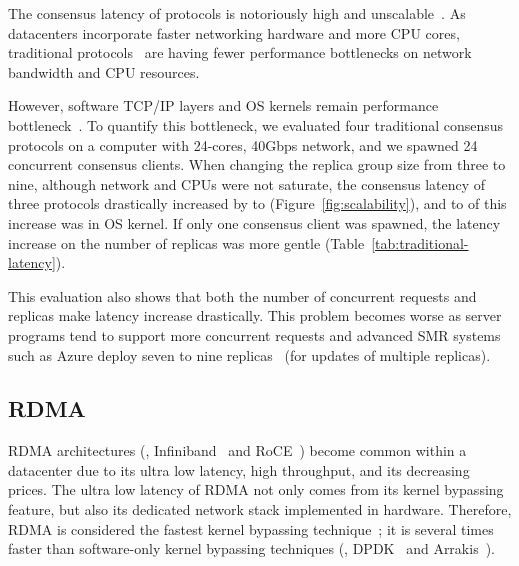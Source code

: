 The consensus latency of \paxos protocols is notoriously high and 
unscalable~\cite{zookeeper,scatter:sosp11}. As datacenters incorporate 
faster networking hardware and more CPU cores, traditional \paxos 
protocols~\cite{libpaxos,spaxos:srds12,crane:sosp15,rex:eurosys14,zookeeper} are 
having fewer performance bottlenecks on network bandwidth and CPU resources. 


However, software TCP/IP layers and OS kernels remain performance 
bottleneck~\cite{arrakis:osdi14}. To quantify this bottleneck, we evaluated 
four traditional consensus protocols on a computer with 24-cores, 40Gbps 
network, and we spawned 24 concurrent consensus clients. When changing the 
replica group size from three to nine, although network and CPUs were not 
saturate, the consensus latency of three protocols drastically increased by 
\tradlatencyincreaselow to \tradlatencyincreasehigh 
(Figure~\ref{fig:scalability}), and \systemcostlow to \systemcosthigh of this 
increase was in OS kernel. If only one consensus client was spawned, the latency 
increase on the number of replicas was more gentle 
(Table~\ref{tab:traditional-latency}).

This evaluation also shows that both the number of concurrent requests and 
replicas make \paxos latency increase drastically. This problem becomes worse 
as server programs tend to support more concurrent requests and advanced SMR 
systems such as Azure deploy seven to nine replicas~\cite{azure:book} 
(for updates of multiple replicas).




\subsection{RDMA}\label{sec:rdma}
RDMA architectures (\eg, Infiniband~\cite{infiniband} and RoCE~\cite{roce})
become common within a datacenter due to its ultra low latency, high 
throughput, and its decreasing prices. The ultra low latency of RDMA not only 
comes from its kernel bypassing feature, but also its dedicated network stack 
implemented in hardware. Therefore, RDMA is considered the fastest kernel 
bypassing 
technique~\cite{herd:sigcomm14,pilaf:usenix14,dare:hpdc15}; it is several times 
faster than software-only kernel bypassing techniques (\eg, DPDK~\cite{dpdk} 
and Arrakis~\cite{arrakis:osdi14}).

